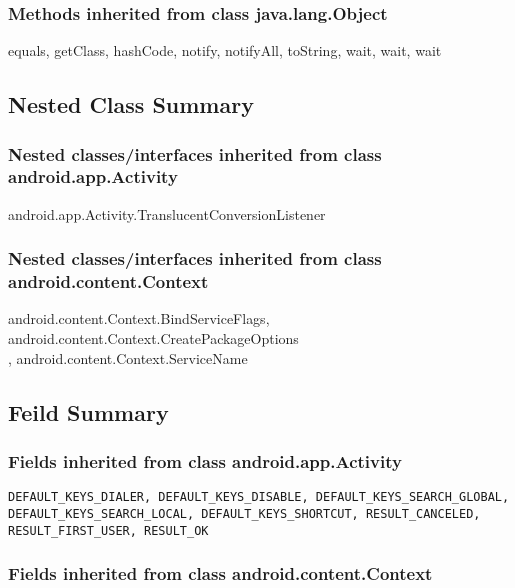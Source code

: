\subsubsection{Methods inherited from class java.lang.Object}
equals, getClass, hashCode, notify, notifyAll, toString, wait, wait, wait\\



\subsection{Nested Class Summary}
\subsubsection{Nested classes/interfaces inherited from class android.app.Activity}

android.app.Activity.TranslucentConversionListener\\

\subsubsection{Nested classes/interfaces inherited from class android.content.Context}

android.content.Context.BindServiceFlags, android.content.Context.CreatePackageOptions\\, android.content.Context.ServiceName\\

\subsection{Feild Summary}
\subsubsection{Fields inherited from class android.app.Activity}

\begin{lstlisting}
DEFAULT_KEYS_DIALER, DEFAULT_KEYS_DISABLE, DEFAULT_KEYS_SEARCH_GLOBAL, DEFAULT_KEYS_SEARCH_LOCAL, DEFAULT_KEYS_SHORTCUT, RESULT_CANCELED, RESULT_FIRST_USER, RESULT_OK
\end{lstlisting}

\subsubsection{Fields inherited from class android.content.Context}


